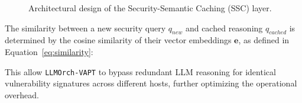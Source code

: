 \begin{figure}[!t]
    \centering
    \resizebox{\columnwidth}{!}{
        
    }
    \caption{Architectural design of the Security-Semantic Caching (SSC) layer.}
    \label{fig:ssc_mechanism}
\end{figure}

The similarity between a new security query $q_{new}$ and cached reasoning $q_{cached}$ is determined by the cosine similarity of their vector embeddings $\mathbf{e}$, as defined in Equation~\ref{eq:similarity}:


This allow \texttt{LLMOrch-VAPT} to bypass redundant LLM reasoning for identical vulnerability signatures across different hosts, further optimizing the operational overhead.
